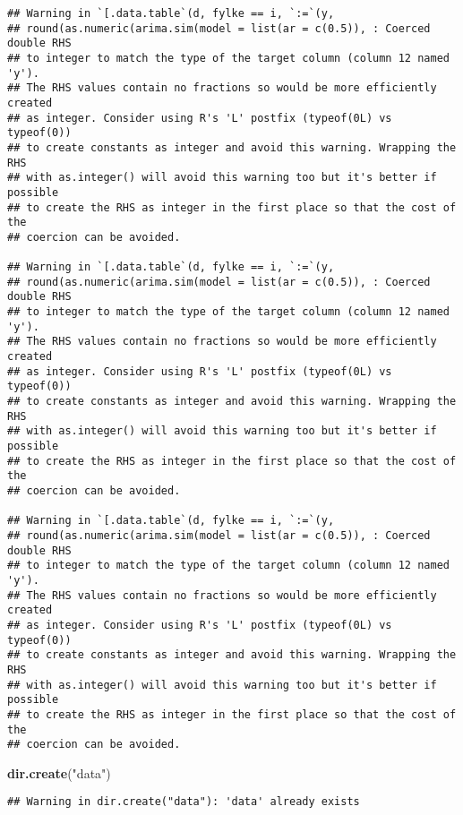 \documentclass[]{book}
\newenvironment{Shaded}{\begin{snugshade}}{\end{snugshade}}
\newcommand{\KeywordTok}[1]{\textcolor[rgb]{0.13,0.29,0.53}{\textbf{#1}}}
\newcommand{\StringTok}[1]{\textcolor[rgb]{0.31,0.60,0.02}{#1}}
\newcommand{\NormalTok}[1]{#1}
\begin{document}
\begin{verbatim}
## Warning in `[.data.table`(d, fylke == i, `:=`(y,
## round(as.numeric(arima.sim(model = list(ar = c(0.5)), : Coerced double RHS
## to integer to match the type of the target column (column 12 named 'y').
## The RHS values contain no fractions so would be more efficiently created
## as integer. Consider using R's 'L' postfix (typeof(0L) vs typeof(0))
## to create constants as integer and avoid this warning. Wrapping the RHS
## with as.integer() will avoid this warning too but it's better if possible
## to create the RHS as integer in the first place so that the cost of the
## coercion can be avoided.

## Warning in `[.data.table`(d, fylke == i, `:=`(y,
## round(as.numeric(arima.sim(model = list(ar = c(0.5)), : Coerced double RHS
## to integer to match the type of the target column (column 12 named 'y').
## The RHS values contain no fractions so would be more efficiently created
## as integer. Consider using R's 'L' postfix (typeof(0L) vs typeof(0))
## to create constants as integer and avoid this warning. Wrapping the RHS
## with as.integer() will avoid this warning too but it's better if possible
## to create the RHS as integer in the first place so that the cost of the
## coercion can be avoided.

## Warning in `[.data.table`(d, fylke == i, `:=`(y,
## round(as.numeric(arima.sim(model = list(ar = c(0.5)), : Coerced double RHS
## to integer to match the type of the target column (column 12 named 'y').
## The RHS values contain no fractions so would be more efficiently created
## as integer. Consider using R's 'L' postfix (typeof(0L) vs typeof(0))
## to create constants as integer and avoid this warning. Wrapping the RHS
## with as.integer() will avoid this warning too but it's better if possible
## to create the RHS as integer in the first place so that the cost of the
## coercion can be avoided.
\end{verbatim}

\begin{Shaded}
\begin{Highlighting}[]
\KeywordTok{dir.create}\NormalTok{(}\StringTok{"data"}\NormalTok{)}
\end{Highlighting}
\end{Shaded}

\begin{verbatim}
## Warning in dir.create("data"): 'data' already exists
\end{verbatim}
\end{document}

